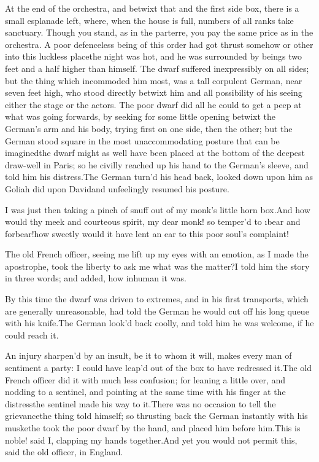 \documentclass[twoside]{article}
\begin{document}
At the end of the orchestra, and betwixt that and the first side box,
there is a small esplanade left, where, when the house is full, numbers
of all ranks take sanctuary.  Though you stand, as in the parterre, you
pay the same price as in the orchestra.  A poor defenceless being of this
order had got thrust somehow or other into this luckless place\tsk the night
was hot, and he was surrounded by beings two feet and a half higher than
himself.  The dwarf suffered inexpressibly on all sides; but the thing
which incommoded him most, was a tall corpulent German, near seven feet
high, who stood directly betwixt him and all possibility of his seeing
either the stage or the actors.  The poor dwarf did all he could to get a
peep at what was going forwards, by seeking for some little opening
betwixt the German’s arm and his body, trying first on one side, then the
other; but the German stood square in the most unaccommodating posture
that can be imagined\tsk the dwarf might as well have been placed at the
bottom of the deepest draw-well in Paris; so he civilly reached up his
hand to the German’s sleeve, and told him his distress.\tsk The German turn’d
his head back, looked down upon him as Goliah did upon David\tsk and
unfeelingly resumed his posture.

I was just then taking a pinch of snuff out of my monk’s little horn
box.\tsk And how would thy meek and courteous spirit, my dear monk! so
temper’d to \i{bear and forbear}!\tsk how sweetly would it have lent an ear to
this poor soul’s complaint!

The old French officer, seeing me lift up my eyes with an emotion, as I
made the apostrophe, took the liberty to ask me what was the matter?\tsk I
told him the story in three words; and added, how inhuman it was.

By this time the dwarf was driven to extremes, and in his first
transports, which are generally unreasonable, had told the German he
would cut off his long queue with his knife.\tsk The German look’d back
coolly, and told him he was welcome, if he could reach it.

An injury sharpen’d by an insult, be it to whom it will, makes every man
of sentiment a party: I could have leap’d out of the box to have
redressed it.\tsk The old French officer did it with much less confusion; for
leaning a little over, and nodding to a sentinel, and pointing at the
same time with his finger at the distress\tsk the sentinel made his way to
it.\tsk There was no occasion to tell the grievance\tsk the thing told himself;
so thrusting back the German instantly with his musket\tsk he took the poor
dwarf by the hand, and placed him before him.\tsk This is noble! said I,
clapping my hands together.\tsk And yet you would not permit this, said the
old officer, in England.
\end{document}
